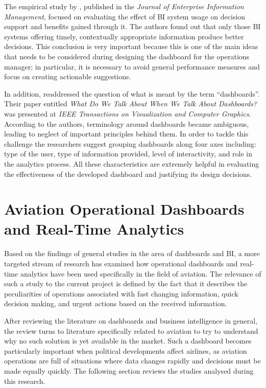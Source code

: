 The empirical study by \citet{Rouhani2016}, published in the \textit{Journal of Enterprise Information Management}, focused on evaluating the effect of BI system usage on decision support and benefits gained through it. The authors found out that only those BI systems offering timely, contextually appropriate information produce better decisions. This conclusion is very important because this is one of the main ideas that needs to be considered during designing the dashboard for the operations manager; in particular, it is necessary to avoid general performance measures and focus on creating actionable suggestions.

In addition, \citet{Sarikaya2019} readdressed the question of what is meant by the term ``dashboards''. Their paper entitled \emph{What Do We Talk About When We Talk About Dashboards?} was presented at \textit{IEEE Transactions on Visualization and Computer Graphics}. According to the authors, terminology around dashboards became ambiguous, leading to neglect of important principles behind them. In order to tackle this challenge the researchers suggest grouping dashboards along four axes including: type of the user, type of information provided, level of interactivity, and role in the analytics process. All these characteristics are extremely helpful in evaluating the effectiveness of the developed dashboard and justifying its design decisions.

\section{Aviation Operational Dashboards and Real-Time Analytics}
\label{sec:ch2:aviation}

Based on the findings of general studies in the area of dashboards and BI, a more targeted stream of research has examined how operational dashboards and real-time analytics have been used specifically in the field of aviation. The relevance of such a study to the current project is defined by the fact that it describes the peculiarities of operations associated with fast changing information, quick decision making, and urgent actions based on the received information.

After reviewing the literature on dashboards and business intelligence in general, the review turns to literature specifically related to aviation to try to understand why no such solution is yet available in the market. Such a dashboard becomes particularly important when political developments affect airlines, as aviation operations are full of situations where data changes rapidly and decisions must be made equally quickly. The following section reviews the studies analysed during this research.

